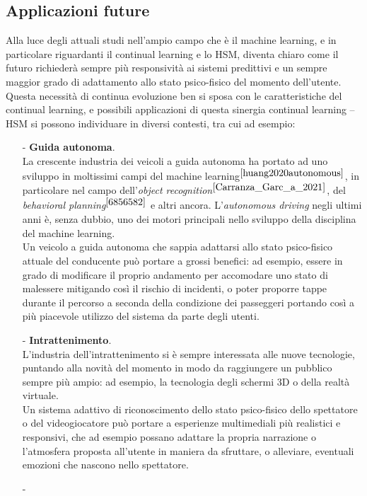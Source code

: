 \subsection{Applicazioni future}
Alla luce degli attuali studi nell'ampio campo che è il machine learning, e in particolare riguardanti il continual learning e lo HSM, diventa chiaro come il futuro richiederà sempre più responsività ai sistemi predittivi e un sempre maggior grado di adattamento allo stato psico-fisico del momento dell'utente. Questa necessità di continua evoluzione ben si sposa con le caratteristiche del continual learning, e possibili applicazioni di questa sinergia continual learning -- HSM si possono individuare in diversi contesti, tra cui ad esempio:
\pagebreak
\begin{itemize}
    \item[-] \textbf{Guida autonoma}.\\La crescente industria dei veicoli a guida autonoma ha portato ad uno sviluppo in moltissimi campi del machine learning$^{\cite{huang2020autonomous}}$, in particolare nel campo dell'\textit{object recognition}$^{\cite{Carranza_Garc_a_2021}}$, del \textit{behavioral planning}$^{\cite{6856582}}$ e altri ancora. L'\textit{autonomous driving} negli ultimi anni è, senza dubbio, uno dei motori principali nello sviluppo della disciplina del machine learning.\\
    Un veicolo a guida autonoma che sappia adattarsi allo stato psico-fisico attuale del conducente può portare a grossi benefici: ad esempio, essere in grado di modificare il proprio andamento per accomodare uno stato di malessere mitigando così il rischio di incidenti, o poter proporre tappe durante il percorso a seconda della condizione dei passeggeri portando così a più piacevole utilizzo del sistema da parte degli utenti.
    \item[-] \textbf{Intrattenimento}.\\L'industria dell'intrattenimento si è sempre interessata alle nuove tecnologie, puntando alla novità del momento in modo da raggiungere un pubblico sempre più ampio: ad esempio, la tecnologia degli schermi 3D o della realtà virtuale.\\
    Un sistema adattivo di riconoscimento dello stato psico-fisico dello spettatore o del videogiocatore può portare a esperienze multimediali più realistici e responsivi, che ad esempio possano adattare la propria narrazione o l'atmosfera proposta all'utente in maniera da sfruttare, o alleviare, eventuali emozioni che nascono nello spettatore.
    \item[-] %
\end{itemize}
